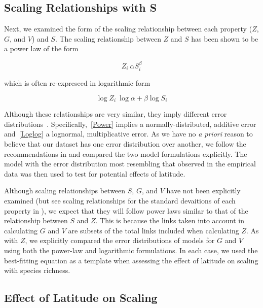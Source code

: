 \documentclass[12pt]{article}
\begin{document}
\subsection*{Scaling Relationships with S}

Next, we examined the form of the scaling relationship between each 
property ($Z$, $G$, and $V$) and $S$. The scaling relationship between $Z$ and 
$S$ has been shown to be a power law \citep{Riede2010} of the form 

\begin{equation}
\label{Power}
Z_{i}~\alpha S_{i}^{\beta}
\end{equation}

which is often re-expreseed in logarithmic form 

\begin{equation}
\label{Loglog}
\log{Z_{i}} ~ \log{\alpha} + \beta\log{S_{i}}
\end{equation}


Although these relationships are very similar, they imply different error distributions~\citep{Xiao2011}.
Specifically,~\ref{Power} implies a normally-distributed, additive error and~\ref{Loglog} a lognormal,
multiplicative error. As we have no \emph{a priori} reason to believe that our dataset has one error distribution
over another, we follow the recommendations in \citet{Xiao2011} and compared the two
model formulations explicitly. The model with the error distribution most resembling that observed in the empirical
data was then used to test for potential effects of latitude.


Although scaling relationships between $S$, $G$, and $V$ have not been explicitly examined (but see scaling 
relationships for the standard devaitions of each property in \citet{Riede2010}), we expect that they will follow
power laws similar to that of the relationship between $S$ and $Z$. This is because the links taken into account in
calculating $G$ and $V$ are subsets of the total links included when calculating $Z$. As with $Z$, we explicitly 
compared the error distributions of models for $G$ and $V$ using both the power-law and logarithmic formulations. 
In each case, we used the best-fitting equation as a template when assessing the effect of latitude on scaling with
species richness.



\subsection*{Effect of Latitude on Scaling}
\end{document}
